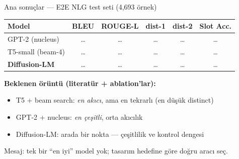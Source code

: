 \documentclass[10pt,aspectratio=169]{beamer}
\begin{document}
\begin{frame}{Ana sonuçlar --- E2E NLG test seti (4{,}693 örnek)}
  \begin{table}
    \centering
    \renewcommand{\arraystretch}{1.25}
    \begin{tabular}{lccccc}
      \toprule
      Model & BLEU & ROUGE-L & dist-1 & dist-2 & Slot Acc. \\
      \midrule
      GPT-2 (nucleus)       & \dots & \dots & \dots & \dots & \dots \\
      T5-small (beam-4)     & \dots & \dots & \dots & \dots & \dots \\
      \textbf{Diffusion-LM} & \dots & \dots & \dots & \dots & \dots \\
      \bottomrule
    \end{tabular}
  \end{table}

  \vspace{0.4em}
  \textbf{Beklenen örüntü (literatür + ablation'lar):}
  \begin{itemize}
    \item T5 + beam search: \emph{en akıcı}, ama en tekrarlı (en düşük distinct)
    \item GPT-2 + nucleus: \emph{en çeşitli}, orta akıcılık
    \item Diffusion-LM: arada bir nokta --- çeşitlilik ve kontrol dengesi
  \end{itemize}

  \vspace{0.3em}
  \footnotesize Mesaj: tek bir ``en iyi'' model yok; tasarım hedefine göre
  doğru aracı seç.
\end{frame}
\end{document}
